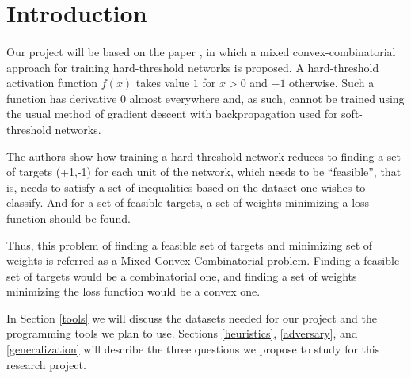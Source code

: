\section{Introduction}
\paragraph{}
Our project will be based on the paper \cite{Friesen}, in which a mixed convex-combinatorial approach for training hard-threshold networks is proposed. A hard-threshold activation function $f(x)$ takes value $1$ for $x > 0$ and $-1$ otherwise. Such a function has derivative 0 almost everywhere and, as such, cannot be trained using the usual method of gradient descent with backpropagation used for soft-threshold networks.

The authors show how training a hard-threshold network reduces to finding a set of targets (+1,-1) for each unit of the network, which needs to be ``feasible'', that is, needs to satisfy a set of inequalities based on the dataset one wishes to classify. And for a set of feasible targets, a set of weights minimizing a loss function should be found.

Thus, this problem of finding a feasible set of targets and minimizing set of weights is referred as a Mixed Convex-Combinatorial problem. Finding a feasible set of targets would be a combinatorial one, and finding a set of weights minimizing the loss function would be a convex one.

In Section \ref{tools} we will discuss the datasets needed for our project and the programming tools we plan to use. Sections \ref{heuristics}, \ref{adversary}, and \ref{generalization} will describe the three questions we propose to study for this research project.